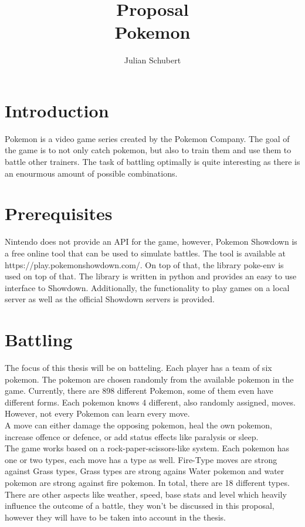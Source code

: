 \documentclass{article}
\title{Proposal \\ Pokemon}
\author{Julian Schubert}
\begin{document}
\maketitle

\section{Introduction}
Pokemon is a video game series created by the Pokemon Company.
The goal of the game is to not only catch pokemon, but also to train them and use
them to battle other trainers. The task of battling optimally is quite interesting
as there is an enourmous amount of possible combinations.

\section{Prerequisites}
Nintendo does not provide an API for the game, however, Pokemon Showdown is a
free online tool that can be used to simulate battles. The tool is available at
https://play.pokemonshowdown.com/. On top of that, the library poke-env is used
on top of that. The library is written in python and provides an easy to use
interface to Showdown. Additionally, the functionality to play games on a 
local server as well as the official Showdown servers is provided.

\section{Battling}
The focus of this thesis will be on batteling. Each player has a team of six 
pokemon. The pokemon are chosen randomly from the available
pokemon in the game. Currently, there are 898 different Pokemon, some of them 
even have different forms. Each pokemon knows 4 different, also randomly assigned,
moves. However, not every Pokemon can learn every move. \\
A move can either damage the opposing pokemon, heal the own pokemon, increase offence
or defence, or add status effects like paralysis or sleep. \\
The game works based on a rock-paper-scissors-like system. Each pokemon has one
or two types, each move has a type as well. Fire-Type moves are strong against
Grass types, Grass types are strong agains Water pokemon and water pokemon
are strong against fire pokemon. In total, there are 18 different types. \\
There are other aspects like weather, speed, base stats and level which
heavily influence the outcome of a battle, they won't be discussed in 
this proposal, however they will have to be taken into account in the thesis.
\end{document}
